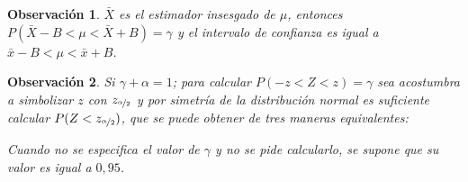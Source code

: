 \documentclass[a5paper,doc,10pt,noapacite]{apa6}
\newtheorem{observ}{Observación}
\begin{document}
{{\begin{observ}\label{obs-4.2}
	\(\bar{X}\) es el estimador insesgado de \(\mu\), entonces \(P(\bar{X}-B<\mu<\bar{X}+B)=\gamma\) y el intervalo de confianza es igual a \(\bar{x}-B<\mu<\bar{x}+B\).
\end{observ}
	
\begin{observ}
	Si \(\gamma+\alpha=1\); para calcular \(P(-z<Z<z)=\gamma\) sea acostumbra a simbolizar \(z\) con \(z_{\nicefrac{\alpha}{2}}\) y por simetría  de la distribución normal es suficiente calcular \(P(Z<z_{\nicefrac{\alpha}{2}})\), que  se puede obtener de tres maneras equivalentes:

	\begin{figure}[H]
\hspace{-3.5em}
\begin{floatrow}
	\fontsize{8}{11}\selectfont
	\captionsetup{justification=centering, labelfont=footnotesize, font=footnotesize}
\end{floatrow}
\end{figure}
	
	\vspace{-3\baselineskip}
	Cuando no se especifica el valor de \(\gamma\) y no se pide calcularlo, se supone que su valor es igual a \(0,95\).
\end{observ}


}}
\end{document}
